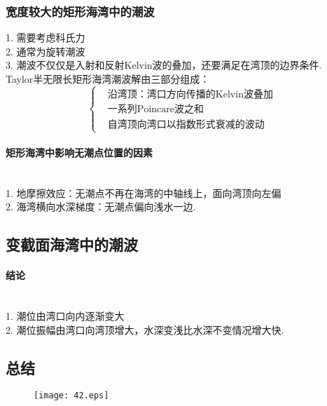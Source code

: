 \documentclass[a4paper,12pt]{article}
\begin{document}
    \subsubsection{宽度较大的矩形海湾中的潮波}
    1. 需要考虑科氏力\\
    2. 通常为旋转潮波\\
    3. 潮波不仅仅是入射和反射Kelvin波的叠加，还要满足在湾顶的边界条件.\\
    Taylor半无限长矩形海湾潮波解由三部分组成：
    \[
        \left\{
            \begin{aligned}
                &\mbox{沿湾顶：湾口方向传播的Kelvin波叠加}\\
                &\mbox{一系列Poincare波之和}\\
                &\mbox{自湾顶向湾口以指数形式衰减的波动}
            \end{aligned}
        \right.
    \]
    \paragraph{矩形海湾中影响无潮点位置的因素}~{}\\
    1. 地摩擦效应：无潮点不再在海湾的中轴线上，面向湾顶向左偏\\
    2. 海湾横向水深梯度：无潮点偏向浅水一边.
    \subsection{变截面海湾中的潮波}
    \paragraph{结论}~{}\\
    1. 潮位由湾口向内逐渐变大\\
    2. 潮位振幅由湾口向湾顶增大，水深变浅比水深不变情况增大快.
    \subsection{总结}
    \begin{figure}[H]
        \centering\texttt{[image: 42.eps]}
    \end{figure}
    
	
\end{document}
